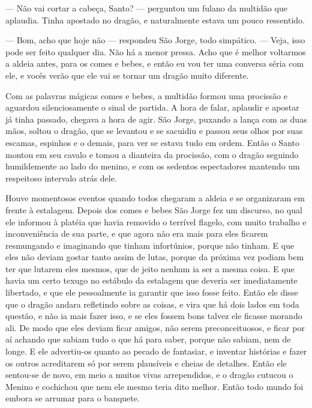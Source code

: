 — Não vai cortar a cabeça, Santo? — perguntou um fulano da multidão
que aplaudia. Tinha apostado no dragão, e naturalmente estava um
pouco ressentido.

— Bom, acho que hoje não — respondeu São Jorge, todo simpático. —
Veja, isso pode ser feito qualquer dia. Não há a menor pressa. Acho
que é melhor voltarmos a aldeia antes, para os comes e bebes, e então
eu vou ter uma conversa séria com ele, e vocês verão que ele vai se
tornar um dragão muito diferente.

Com as palavras mágicas comes e bebes, a multidão formou uma procissão
e aguardou silenciosamente o sinal de partida. A hora de falar,
aplaudir e apostar já tinha passado, chegava a hora de agir. São
Jorge, puxando a lança com as duas mãos, soltou o dragão, que se
levantou e se sacuidiu e passou seus olhos por suas escamas, espinhos
e o demais, para ver se estava tudo em ordem. Então o Santo montou em
seu cavalo e tomou a dianteira da procissão, com o dragão seguindo
humildemente ao lado do menino, e com os sedentos espectadores
mantendo um respeitoso intervalo atrás dele.

Houve momentosos eventos quando todos chegaram a aldeia e se
organizaram em frente à estalagem. Depois dos comes e bebes São Jorge
fez um discurso, no qual ele informou à platéia que havia removido o
terrível flagelo, com muito trabalho e inconveniência de sua parte, e
que agora não era mais para eles ficarem resmungando e imaginando que
tinham infortúnios, porque não tinham. E que eles não deviam gostar
tanto assim de lutas, porque da próxima vez podiam bem ter que
lutarem eles mesmos, que de jeito nenhum ia ser a mesma coisa. E que
havia um certo texugo no estábulo da estalagem que deveria ser
imediatamente libertado, e que ele pessoalmente ia garantir que isso
fosse feito. Então ele disse que o dragão andara refletindo sobre as
coisas, e vira que há dois lados em toda questão, e não ia mais fazer
isso, e se eles fossem bons talvez ele ficasse morando ali. De modo
que eles deviam ficar amigos, não serem preconceituosos, e ficar por
aí achando que sabiam tudo o que há para saber, porque não sabiam,
nem de longe. E ele advertiu-os quanto ao pecado de fantasiar, e
inventar histórias e fazer os outros acreditarem só por serem
plausíveis e cheias de detalhes. Então ele sentou-se de novo, em meio
a muitos vivas arrependidos, e o dragão cutucou o Menino e cochichou
que nem ele mesmo teria dito melhor. Então todo mundo foi embora se
arrumar para o banquete.

